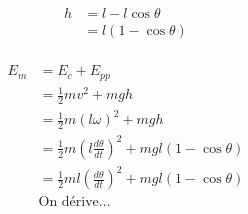 \documentclass{article}
\begin{document}
\begin{align*}
	h &= l - l\cos \theta \\
	  &= l(1 - \cos \theta) \\
\end{align*}

\begin{align*}
	E_m &=  E_c + E_{pp} \\
	&= \frac{1}{2}mv^2+mgh \\
	&= \frac{1}{2}m(l\omega)^2 + mgh \\
	&= \frac{1}{2}m\left( l\frac{d \theta}{dt} \right)^2 + mgl(1-\cos \theta)  \\
	&= \frac{1}{2}ml\left( \frac{d \theta}{dt} \right)^2 + mgl(1-\cos \theta)  \\
	&\text{On dérive\ldots}\\
\end{align*}
\end{document}
